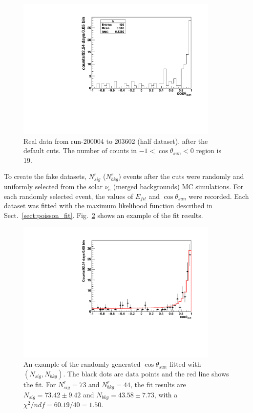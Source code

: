 \begin{figure}[!htb]
	\centering
	\includegraphics[width=10cm]{cosThetaToSun_halfData_5to15.pdf}
	\caption[Real data from run-200004 to 203602 (``half dataset''), after the default cuts.]{Real data from run-200004 to 203602 (half dataset), after the default cuts. The number of counts in $-1<\cos\theta_{sun}<0$ region is 19.}
	\label{half_data}
\end{figure}

To create the fake datasets, $N^r_{sig}$ ($N^r_{bkg}$) events after the cuts were randomly and uniformly selected from the solar $\nu_e$ (merged backgrounds) MC simulations. For each randomly selected event, the values of $E_{fit}$ and $\cos\theta_{sun}$ were recorded. Each dataset was fitted with the maximum likelihood function described in Sect.~\ref{sect:poisson_fit}. Fig.~\ref{ensemble_test} shows an example of the fit results.

\begin{figure}[!htb]
	\centering
	\includegraphics[width=10cm]{ensemble_fitExample.pdf}
	\caption[An example of the randomly generated $\cos\theta_{sun}$ fitted with $(N_{sig},N_{bkg})$.]{An example of the randomly generated $\cos\theta_{sun}$ fitted with $(N_{sig},N_{bkg})$. The black dots are data points and the red line shows the fit. For $N^r_{sig} = 73$ and $N^r_{bkg}=44$, the fit results are $N_{sig} = 73.42\pm9.42$ and $N_{bkg} = 43.58 \pm 7.73$, with a $\chi^2/ndf = 60.19/40 = 1.50$.}
	\label{ensemble_test}
\end{figure} 

